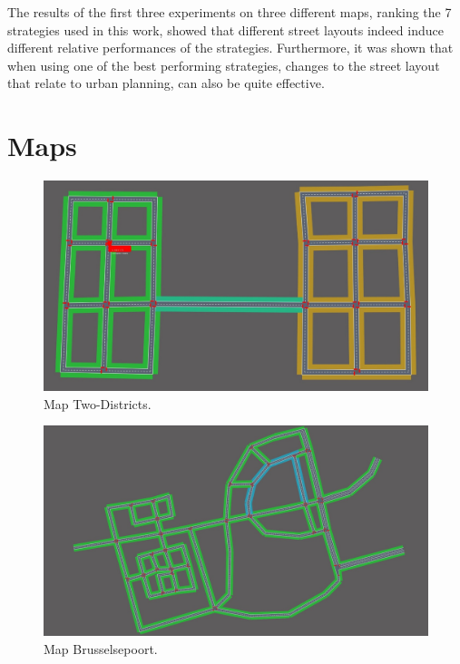 \documentclass[11pt]{article}
\begin{document}
The results of the first three experiments on three different maps, ranking the 7 strategies used in this work, showed that different street layouts indeed induce different relative performances of the strategies. Furthermore, it was shown that when using one of the best performing strategies, changes to the street layout that relate to urban planning, can also be quite effective.

{\tiny\printbibliography}


\clearpage
\raggedbottom
\appendix

\section{Maps}
\begin{figure}[h]
	\includegraphics[width=\linewidth]{img/twodistr.jpeg}
	\caption{Map Two-Districts.}
\end{figure}

\begin{figure}[h]
	\includegraphics[width=\linewidth]{img/maas.jpeg}
	\caption{Map Brusselsepoort.}
\end{figure}
\end{document}
